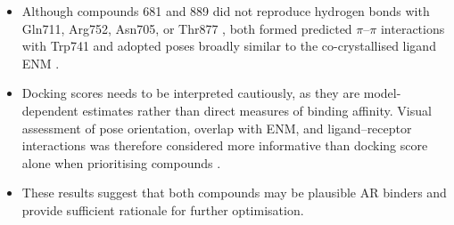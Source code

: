\begin{itemize}
    \item Although compounds 681 and 889 did not reproduce hydrogen bonds with Gln711, Arg752, Asn705, or Thr877 \cite{pereira2006comparison}, both formed predicted $\pi$--$\pi$ interactions with Trp741 and adopted poses broadly similar to the co-crystallised ligand ENM \cite{cantin2007structural}.

     \item Docking scores needs to be interpreted cautiously, as they are model-dependent estimates rather than direct measures of binding affinity. Visual assessment of pose orientation, overlap with ENM, and ligand--receptor interactions was therefore considered more informative than docking score alone when prioritising compounds \cite{errington2025assessing,fischer2021decision}.

    \item These results suggest that both compounds may be plausible AR binders and provide sufficient rationale for further optimisation.

   
\end{itemize}

\clearpage
